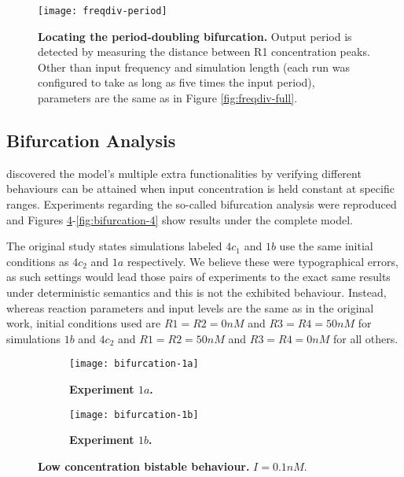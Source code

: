     \begin{figure}[!htb]
      \centering
      \texttt{[image: freqdiv-period]}
      \caption{\textbf{Locating the period-doubling bifurcation.} Output period is detected by measuring the distance between R1 concentration peaks. Other than input frequency and simulation length (each run was configured to take as long as five times the input period), parameters are the same as in Figure \ref{fig:freqdiv-full}.}
      \label{fig:freqdiv-period}
    \end{figure}


  \subsection{Bifurcation Analysis}

    \citet{multif} discovered the model's multiple extra functionalities by verifying different behaviours can be attained when input concentration is held constant at specific ranges.
    Experiments regarding the so-called bifurcation analysis were reproduced and Figures \ref{fig:bifurcation-1}-\ref{fig:bifurcation-4} show results under the complete model.

    The original study states simulations labeled $4c_{1}$ and $1b$ use the same initial conditions as $4c_{2}$ and $1a$ respectively.
    We believe these were typographical errors, as such settings would lead those pairs of experiments to the exact same results under deterministic semantics and this is not the exhibited behaviour.
    Instead, whereas reaction parameters and input levels are the same as in the original work, initial conditions used are $R1=R2=0nM$ and $R3=R4=50nM$ for simulations $1b$ and $4c_{2}$ and $R1=R2=50nM$ and $R3=R4=0nM$ for all others.

    \begin{figure}[!htbp]
      \centering
      \begin{subfigure}[t]{0.85\textwidth}
        \centering
        \texttt{[image: bifurcation-1a]}
        \caption{\textbf{Experiment $1a$.}}
        \label{fig:bifurcation-1a}
      \end{subfigure}
      \begin{subfigure}[t]{0.85\textwidth}
        \centering
        \texttt{[image: bifurcation-1b]}
        \caption{\textbf{Experiment $1b$.}}
        \label{fig:bifurcation-1b}
      \end{subfigure}
      \caption{\textbf{Low concentration bistable behaviour.} $I = 0.1 nM$.}
      \label{fig:bifurcation-1}
    \end{figure}


